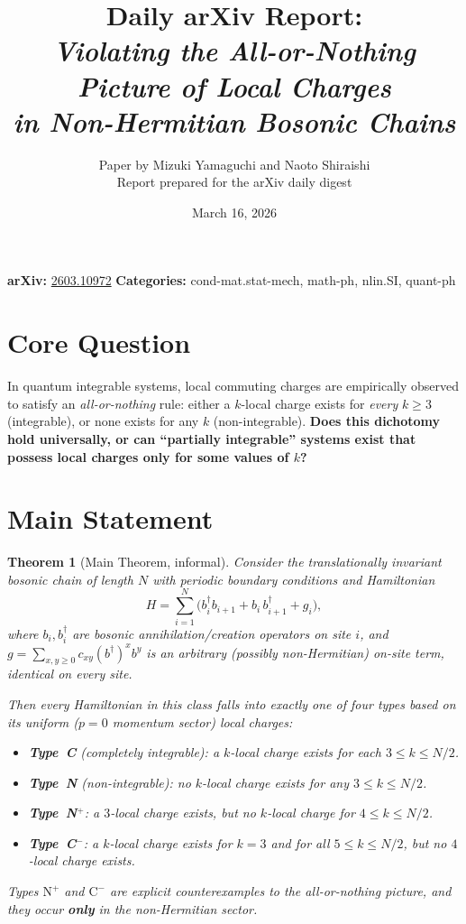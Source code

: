 \documentclass[11pt,a4paper]{article}
\title{Daily arXiv Report:\\[4pt]
\textit{Violating the All-or-Nothing Picture of Local Charges\\
in Non-Hermitian Bosonic Chains}}
\author{Paper by Mizuki Yamaguchi and Naoto Shiraishi\\[2pt]
\small Report prepared for the arXiv daily digest}
\date{March 16, 2026}
\newtheorem{theorem}{Theorem}
\begin{document}
\maketitle

\noindent\textbf{arXiv:} \href{https://arxiv.org/abs/2603.10972}{2603.10972} \quad
\textbf{Categories:} cond-mat.stat-mech, math-ph, nlin.SI, quant-ph

\section{Core Question}

In quantum integrable systems, local commuting charges are empirically observed to satisfy an \emph{all-or-nothing} rule: either a $k$-local charge exists for \emph{every} $k \ge 3$ (integrable), or none exists for any $k$ (non-integrable). \textbf{Does this dichotomy hold universally, or can ``partially integrable'' systems exist that possess local charges only for some values of $k$?}

\section{Main Statement}

\begin{theorem}[Main Theorem, informal]
Consider the translationally invariant bosonic chain of length $N$ with periodic boundary conditions and Hamiltonian
\begin{equation}\label{eq:H}
H = \sum_{i=1}^{N}\bigl(b_i^\dagger b_{i+1} + b_i\, b_{i+1}^\dagger + g_i\bigr),
\end{equation}
where $b_i, b_i^\dagger$ are bosonic annihilation/creation operators on site $i$, and $g = \sum_{x,y\ge 0} c_{xy}(b^\dagger)^x b^y$ is an arbitrary (possibly non-Hermitian) on-site term, identical on every site.

Then every Hamiltonian in this class falls into exactly one of four types based on its uniform ($p=0$ momentum sector) local charges:
\begin{itemize}[nosep]
  \item \textbf{Type~C} (completely integrable): a $k$-local charge exists for each $3 \le k \le N/2$.
  \item \textbf{Type~N} (non-integrable): no $k$-local charge exists for any $3 \le k \le N/2$.
  \item \textbf{Type~N$^+$}: a $3$-local charge exists, but \emph{no} $k$-local charge for $4 \le k \le N/2$.
  \item \textbf{Type~C$^-$}: a $k$-local charge exists for $k=3$ and for all $5 \le k \le N/2$, but \emph{no} $4$-local charge exists.
\end{itemize}
Types $\mathrm{N}^+$ and $\mathrm{C}^-$ are explicit counterexamples to the all-or-nothing picture, and they occur \textbf{only} in the non-Hermitian sector.
\end{theorem}
\end{document}
